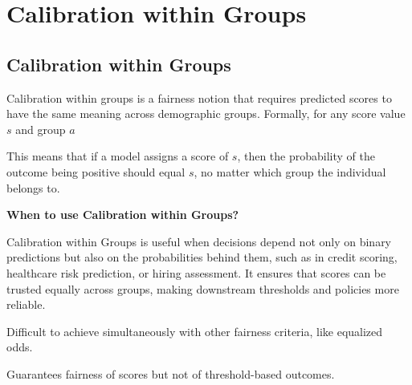 \clearpage
\thispagestyle{biasfairnesstyle}
\section{Calibration within Groups}
\subsection{Calibration within Groups}

Calibration within groups is a fairness notion that requires predicted scores to have the same meaning across demographic groups.
Formally, for any score value $s$ and group $a$

\begin{center}
\end{center}

This means that if a model assigns a score of $s$, then the probability of the outcome being positive should equal $s$,
no matter which group the individual belongs to.

\textbf{When to use Calibration within Groups?}

Calibration within Groups is useful when decisions depend not only on binary predictions but also on the probabilities behind them, 
such as in credit scoring, healthcare risk prediction, or hiring assessment. It ensures that scores can be trusted equally across groups,
making downstream thresholds and policies more reliable.

{
\item Difficult to achieve simultaneously with other fairness criteria, like equalized odds.
\item Guarantees fairness of scores but not of threshold-based outcomes.
}

